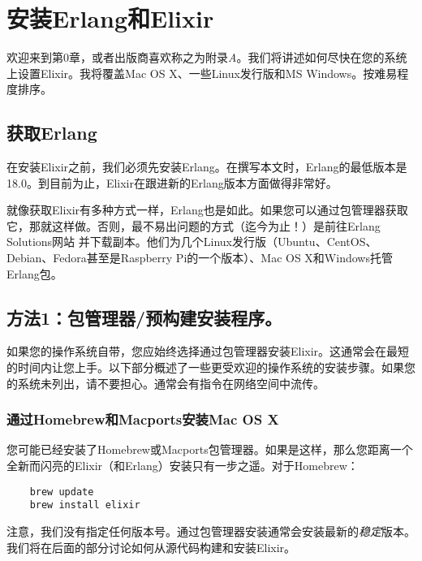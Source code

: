 \chapter{安装Erlang和Elixir}\label{appendix}

欢迎来到第0章，或者出版商喜欢称之为附录\emph{A}。我们将讲述如何尽快在您的系统上设置Elixir。我将覆盖Mac OS X、一些Linux发行版和MS Windows。按难易程度排序。


\section{获取Erlang}

在安装Elixir之前，我们必须先安装Erlang。在撰写本文时，Erlang的最低版本是18.0。到目前为止，Elixir在跟进新的Erlang版本方面做得非常好。

就像获取Elixir有多种方式一样，Erlang也是如此。如果您可以通过包管理器获取它，那就这样做。否则，最不易出问题的方式（迄今为止！）是前往Erlang
Solutions网站
并下载副本。他们为几个Linux发行版（Ubuntu、CentOS、Debian、Fedora甚至是Raspberry
Pi的一个版本）、Mac OS X和Windows托管Erlang包。


\section{方法1：包管理器/预构建安装程序。}

如果您的操作系统自带，您应始终选择通过包管理器安装Elixir。这通常会在最短的时间内让您上手。以下部分概述了一些更受欢迎的操作系统的安装步骤。如果您的系统未列出，请不要担心。通常会有指令在网络空间中流传。


\subsection{通过Homebrew和Macports安装Mac OS X}

您可能已经安装了Homebrew或Macports包管理器。如果是这样，那么您距离一个全新而闪亮的Elixir（和Erlang）安装只有一步之遥。对于Homebrew：

\begin{code}{}
\begin{verbatim}
    brew update
    brew install elixir
\end{verbatim}
\end{code}

注意，我们没有指定任何版本号。通过包管理器安装通常会安装最新的\emph{稳定}版本。我们将在后面的部分讨论如何从源代码构建和安装Elixir。


